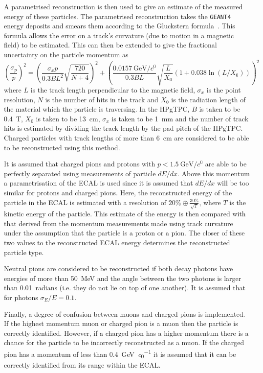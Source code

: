 A parametrised reconstruction is then used to give an estimate of the measured energy of these particles.
The parametrised reconstruction takes the \texttt{GEANT4} energy deposits and smears them according to the Gluckstern formula~\cite{gluckstern}.
This formula allows the error on a track's curvature (due to motion in a magnetic field) to be estimated.
This can then be extended to give the fractional uncertainty on the particle momentum as
\begin{equation}
	\left(\frac{\sigma_{p}}{p}\right)^{2} = \left( \frac{\sigma_{x} p}{0.3 B L^{2}} \sqrt{ \frac{720}{N+4} } \right)^{2} +
	\left( \frac{\SI{0.0157}{\GeV\per\clight}}{0.3BL}\sqrt{\frac{L}{X_{0}}}\left( 1 + 0.038 \ln(L/X_{0}) \right) \right)^{2}
\end{equation}
where $L$ is the track length perpendicular to the magnetic field, $\sigma_{x}$ is the point resolution, $N$ is the number of hits in the track and $X_0$ is the radiation length of the material which the particle is traversing.
In the HPgTPC, $B$ is taken to be \SI{0.4}{\tesla}, $X_{0}$ is taken to be \SI{13}{\cm}, $\sigma_{x}$ is taken to be \SI{1}{\mm} and the number of track hits is estimated by dividing the track length by the pad pitch of the HPgTPC.
Charged particles with track lengths of more than \SI{6}{\cm} are considered to be able to be reconstructed using this method.

It is assumed that charged pions and protons with $p < \SI{1.5}{\GeV\per\clight}$ are able to be perfectly separated using measurements of particle $dE/dx$.
Above this momentum a parametrisation of the ECAL is used since it is assumed that $dE/dx$ will be too similar for protons and charged pions.
Here, the reconstructed energy of the particle in the ECAL is estimated with a resolution of 
$20\% \oplus \frac{30\%}{\sqrt{T}}$, where $T$ is the kinetic energy of the particle.
This estimate of the energy is then compared with that derived from the momentum measurements made using track curvature under the assumption that the particle is a proton or a pion.
The closer of these two values to the reconstructed ECAL energy determines the reconstructed particle type.

Neutral pions are considered to be reconstructed if both decay photons have energies of more than \SI{50}{\MeV} and the angle between the two photons is larger than 0.01~radians (i.e. they do not lie on top of one another).
It is assumed that for photons $\sigma_{E}/E = 0.1$.

Finally, a degree of confusion between muons and charged pions is implemented.
If the highest momentum muon or charged pion is a muon then the particle is correctly identified.
However, if a charged pion has a higher momentum there is a chance for the particle to be incorrectly reconstructed as a muon.
If the charged pion has a momentum of less than \SI{0.4}{\GeV\per\clight} it is assumed that it can be correctly identified from its range within the ECAL.

